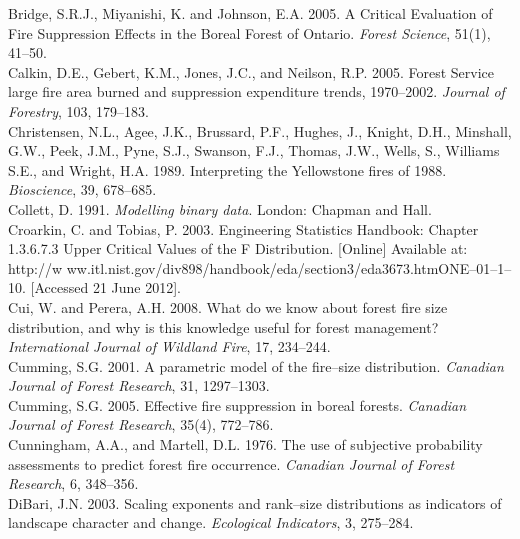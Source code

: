 \begin{spacing}{1.5}
\noindent Bridge, S.R.J., Miyanishi, K. and Johnson, E.A. 2005. A Critical Evaluation of Fire Suppression Effects in the Boreal Forest of Ontario. \emph{Forest Science}, 51(1), 41--50.\\

\noindent Calkin, D.E., Gebert, K.M., Jones, J.C., and Neilson, R.P. 2005. Forest Service large fire area burned and suppression expenditure trends, 1970--2002. \emph{Journal of Forestry}, 103, 179--183.\\

\noindent Christensen, N.L., Agee, J.K., Brussard, P.F., Hughes, J., Knight, D.H., Minshall, G.W., Peek, J.M., Pyne, S.J., Swanson, F.J., Thomas, J.W., Wells, S., Williams S.E., and Wright, H.A. 1989. Interpreting the Yellowstone fires of 1988. \emph{Bioscience}, 39, 678--685.\\

\noindent Collett, D. 1991. \emph{Modelling binary data}. London: Chapman and Hall.\\

\noindent Croarkin, C. and Tobias, P. 2003. Engineering Statistics Handbook: Chapter 1.3.6.7.3 Upper Critical Values of the F Distribution. [Online] Available at: http://w ww.itl.nist.gov/div898/handbook/eda/section3/eda3673.htmONE--01--1--10. [Accessed 21 June 2012].\\

\noindent Cui, W. and Perera, A.H. 2008. What do we know about forest fire size distribution, and why is this knowledge useful for forest management? \emph{International Journal of Wildland Fire}, 17, 234--244.\\

\noindent Cumming, S.G. 2001. A parametric model of the fire--size distribution. \emph{Canadian Journal of Forest Research}, 31, 1297--1303.\\

\noindent Cumming, S.G. 2005. Effective fire suppression in boreal forests. \emph{Canadian Journal of Forest Research}, 35(4), 772--786.\\

\noindent Cunningham, A.A., and Martell, D.L. 1976. The use of subjective probability assessments to predict forest fire occurrence. \emph{Canadian Journal of Forest Research}, 6, 348--356.\\

\noindent DiBari, J.N. 2003. Scaling exponents and rank--size distributions as indicators of landscape character and change. \emph{Ecological Indicators}, 3, 275--284.\\


\end{spacing}
